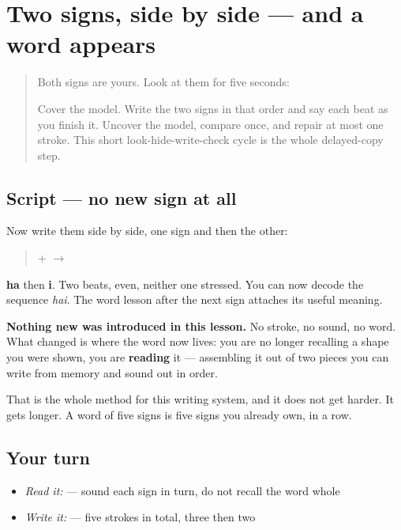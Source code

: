 \section[\texorpdfstring{\ja{はい} (hai)}{はい (hai)}]{Two signs, side by side — and a word appears}

\label{lesson:JA-W01-hai-read}



\begin{quote}
Both signs are yours. Look at them for five seconds:

\begin{quote}
   
\end{quote}

Cover the model. Write the two signs in that order and say each beat as you finish it. Uncover the model, compare once, and repair at most one stroke. This short look-hide-write-check cycle is the whole delayed-copy step.
\end{quote}

\subsection*{Script — no new sign at all}

Now write them side by side, one sign and then the other:

\begin{quote}
\textbf{} + \textbf{} $\to$ \textbf{}
\end{quote}

\textbf{ha} then \textbf{i}. Two beats, even, neither one stressed. You can now decode the sequence \emph{hai}. The word lesson after the next sign attaches its useful meaning.

\textbf{Nothing new was introduced in this lesson.} No stroke, no sound, no word. What changed is where the word now lives: you are no longer recalling a shape you were shown, you are \textbf{reading} it — assembling it out of two pieces you can write from memory and sound out in order.

That is the whole method for this writing system, and it does not get harder. It gets longer. A word of five signs is five signs you already own, in a row.

\subsection*{Your turn}
\begin{itemize}
\raggedright
  \item \emph{Read it:} \textbf{} — sound each sign in turn, do not recall the word whole
  \item \emph{Write it:}  — five strokes in total, three then two
\end{itemize}

